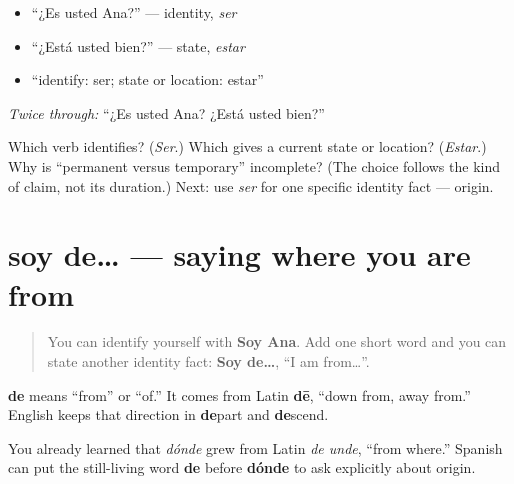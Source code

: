 \begin{itemize}
\raggedright
  \item “¿Es usted Ana?” — identity, \emph{ser}
  \item “¿Está usted bien?” — state, \emph{estar}
  \item “identify: ser; state or location: estar”
\end{itemize}

\emph{Twice through:} “¿Es usted Ana? ¿Está usted bien?”

\begin{tcolorbox}[breakable,colback=teal!4,colframe=teal!35!black,title={Before you move on}]
Which verb identifies? (\emph{Ser}.) Which gives a current state or location? (\emph{Estar}.) Why is “permanent versus temporary” incomplete? (The choice follows the kind of claim, not its duration.) Next: use \emph{ser} for one specific identity fact — origin.
\end{tcolorbox}
\section[soy de…]{soy de… — saying where you are from}

\label{lesson:ES-C09-soy-de}



\begin{quote}
You can identify yourself with \textbf{Soy Ana}. Add one short word and you can state another identity fact: \textbf{Soy de…}, “I am from…”.
\end{quote}

\begin{cousinweb}
\textbf{de} means “from” or “of.” It comes from Latin \textbf{dē}, “down from, away from.” English keeps that direction in \textbf{de}part and \textbf{de}scend.

You already learned that \emph{dónde} grew from Latin \emph{de unde}, “from where.” Spanish can put the still-living word \textbf{de} before \textbf{dónde} to ask explicitly about origin.
\end{cousinweb}

